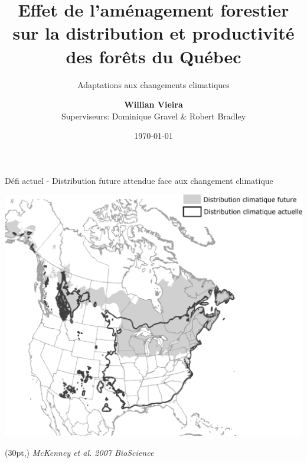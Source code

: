 \documentclass[11pt, compress, aspectratio=1610]{beamer}
\title{Effet de l'aménagement forestier sur la distribution et productivité des
forêts du Québec}
\subtitle{Adaptations aux changements climatiques}
\date{\today}
\author{\textbf{Willian Vieira}\\
Superviseurs: Dominique Gravel \& Robert Bradley \newline}
\institute{}
\newcommand\smallcitation[1]{%
\begin{textblock*}{\textwidth}(30pt,\textheight)
	\raggedleft \footnotesize\textit{#1}
\end{textblock*}}
\begin{document}
\maketitle

\begin{frame}{Défi actuel - Distribution future attendue face aux
changement climatique}

\centering
 \includegraphics[scale=0.4]{figures/mckenney.pdf}\par

\smallcitation{McKenney et al. 2007 BioScience}

\end{frame}
\end{document}
